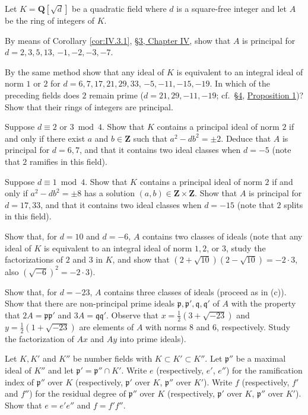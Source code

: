  Let $K=\mathbf{Q}[\sqrt{d}]$ be a quadratic field where $d$ is a
square-free integer and let $A$ be the ring of integers of $K$.
\begin{alist}
\item By means of Corollary \ref{cor:IV.3.1}, \hyperref[sec:4.3]{§3, Chapter IV}, show that $A$
is principal for $d=2,3,5,13$,
$-1,-2,-3,-7$.
\item By the same method show that any ideal of $K$ is equivalent to an
integral ideal of norm $1$ or $2$ for $d=6,7,17,21,29,33$,
$-5,-11,-15,-19$.
In which of the preceding fields does $2$ remain prime
($d=21,29,-11,-19$; cf.\ \hyperref[sec:5.4]{§4}, \hyperref[prop:V.4.1]{Proposition 1})? Show that their rings of
integers are principal.
\item Suppose $d\equiv2$ or $3\bmod4$. Show that $K$ contains a principal
ideal of norm $2$ if and only if there exist $a$ and $b\in\mathbf{Z}$ such
that $a^{2}-db^{2}=\pm2$. Deduce that $A$ is principal for $d=6,7$, and that
it contains two ideal classes when $d=-5$ (note that $2$ ramifies in this
field).
\item Suppose $d\equiv1\bmod4$. Show that $K$ contains a principal ideal of
norm $2$ if and only if $a^{2}-db^{2}=\pm8$ has a solution
$(a,b)\in\mathbf{Z}\times\mathbf{Z}$. Show that $A$ is principal for
$d=17,33$, and that it contains two ideal classes when $d=-15$ (note that
$2$ splits in this field).
\item Show that, for $d=10$ and $d=-6$, $A$ contains two classes of ideals
(note that any ideal of $K$ is equivalent to an integral ideal of norm
$1,2$, or $3$, study the factorizations of $2$ and $3$ in $K$, and show that
$(2+\sqrt{10})(2-\sqrt{10})=-2\cdot3$, also
$(\sqrt{-6})^{2}=-2\cdot3$).
\item Show that, for $d=-23$, $A$ contains three classes of ideals (proceed
as in (c)). Show that there are non-principal prime ideals
$\mathfrak{p},\mathfrak{p}',\mathfrak{q},\mathfrak{q}'$ of $A$ with the
property that $2A=\mathfrak{p}\mathfrak{p}'$ and
$3A=\mathfrak{q}\mathfrak{q}'$. Observe that
$x=\frac{1}{2}(3+\sqrt{-23})$ and $y=\frac{1}{2}(1+\sqrt{-23})$ are elements
of $A$ with norms $8$ and $6$, respectively. Study the factorization of $Ax$
and $Ay$ into prime ideals).
\end{alist}

 Let $K,K'$ and $K''$ be number fields with
$K\subset K'\subset K''$. Let $\mathfrak{p}''$ be a maximal ideal of $K''$
and let $\mathfrak{p}'=\mathfrak{p}''\cap K'$. Write $e$ (respectively,
$e'$, $e''$) for the ramification index of $\mathfrak{p}''$ over $K$
(respectively, $\mathfrak{p}'$ over $K$, $\mathfrak{p}''$ over $K'$). Write
$f$ (respectively, $f'$ and $f''$) for the residual degree of
$\mathfrak{p}''$ over $K$ (respectively, $\mathfrak{p}'$ over $K$,
$\mathfrak{p}''$ over $K'$). Show that $e=e'e''$ and $f=f'f''$.

